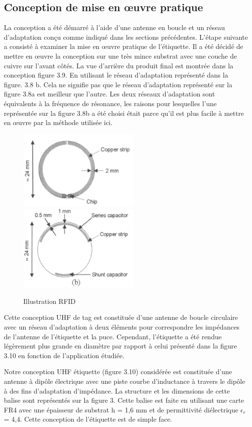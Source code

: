 \documentclass[11pt, a4paper, twoside]{book}
\begin{document}
\subsection{Conception de mise en œuvre pratique}
La conception a été démarré à l'aide d'une antenne en boucle et un réseau d'adaptation conçu comme indiqué dans les sections précédentes. L'étape suivante a consisté à examiner la mise en œuvre pratique de l'étiquette. Il a été décidé de mettre en œuvre la conception sur une très mince substrat avec une couche de cuivre sur l'avant côtés. La vue d'arrière du produit final est montrée dans la conception figure 3.9. En utilisant le réseau d'adaptation représenté dans la figure. 3.8 b. Cela ne signifie pas que le réseau d'adaptation représenté sur la figure 3.8a est meilleur que l'autre. Les deux réseaux d'adaptation sont équivalents à la fréquence de résonance, les raisons pour lesquelles l'une représentée sur la figure 3.8b a été choisi était parce qu'il est plus facile à mettre en œuvre par la méthode utilisée ici.

\begin{figure}[H]
\centering
\includegraphics[width=6cm]{front}
\includegraphics[width=6cm]{back}
\caption{Illustration RFID}
\end{figure}

Cette conception UHF de tag est constituée d'une antenne de boucle circulaire avec un réseau d'adaptation à deux éléments pour correspondre les impédances de l'antenne de l'étiquette et la puce. Cependant, l'étiquette a été rendue légèrement plus grande en diamètre par rapport à celui présenté dans la figure 3.10 en fonction de l'application étudiée. 

Notre conception UHF étiquette (figure 3.10) considérée est constituée d'une antenne à dipôle électrique avec une piste courbe d'inductance à travers le dipôle à des fins d'adaptation d'impédance. La structure et les dimensions de cette balise sont représentés sur la figure 3. Cette balise est faite en utilisant une carte FR4 avec une épaisseur de substrat h = 1,6 mm et de permittivité diélectrique \(\epsilon_{r}\) = 4,4. Cette conception de l'étiquette est de simple face.
\end{document}
